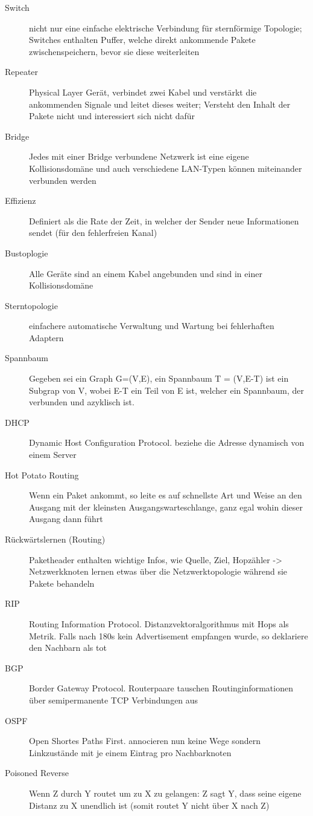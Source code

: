 \documentclass[10pt,landscape]{article}
\begin{document}
\begin{multicols}{3}
\begin{description}
    \item[Switch] nicht nur eine einfache elektrische Verbindung für sternförmige Topologie; Switches enthalten Puffer, welche direkt ankommende Pakete zwischenspeichern, bevor sie diese weiterleiten
    \item[Repeater] Physical Layer Gerät, verbindet zwei Kabel und verstärkt die ankommenden Signale und leitet dieses weiter; Versteht den Inhalt der Pakete nicht und interessiert sich nicht dafür
    \item[Bridge] Jedes mit einer Bridge verbundene Netzwerk ist eine eigene Kollisionsdomäne und auch verschiedene LAN-Typen können miteinander verbunden werden
    \item[Effizienz] Definiert als die Rate der Zeit, in welcher der Sender neue Informationen sendet (für den fehlerfreien Kanal)
    \item[Bustoplogie] Alle Geräte sind an einem Kabel angebunden und sind in einer Kollisionsdomäne
    \item[Sterntopologie] einfachere automatische Verwaltung und Wartung bei fehlerhaften Adaptern
    \item[Spannbaum] Gegeben sei ein Graph G=(V,E), ein Spannbaum T = (V,E-T) ist ein Subgrap von V, wobei E-T ein Teil von E ist, welcher ein Spannbaum, der verbunden und azyklisch ist. 
    \item[DHCP] Dynamic Host Configuration Protocol. beziehe die Adresse dynamisch von einem Server 
    \item[Hot Potato Routing] Wenn ein Paket ankommt, so leite es auf schnellste Art und Weise an den Ausgang mit der kleinsten Ausgangswarteschlange, ganz egal wohin dieser Ausgang dann führt
    \item[Rückwärtslernen (Routing)] Paketheader enthalten wichtige Infos, wie Quelle, Ziel, Hopzähler -> Netzwerkknoten lernen etwas über die Netzwerktopologie während sie Pakete behandeln
    \item[RIP] Routing Information Protocol. Distanzvektoralgorithmus mit Hops als Metrik. Falls nach 180s kein Advertisement empfangen wurde, so deklariere den Nachbarn als tot
    \item[BGP] Border Gateway Protocol. Routerpaare tauschen Routinginformationen über semipermanente TCP Verbindungen aus
    \item[OSPF] Open Shortes Paths First. annocieren nun keine Wege sondern Linkzustände mit je einem Eintrag pro Nachbarknoten 
    \item[Poisoned Reverse] Wenn Z durch Y routet um zu X zu gelangen: Z sagt Y, dass seine eigene Distanz zu X unendlich ist (somit routet Y nicht über X nach Z) 

\end{description}
\end{multicols}
\end{document}
